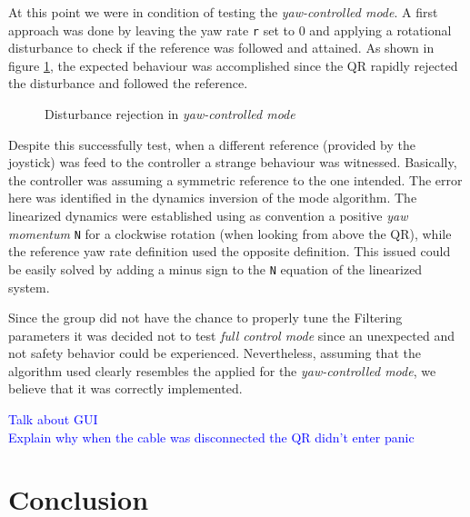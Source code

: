 \documentclass{article}
\newcommand\todo[1]{\textcolor{blue}{#1}} %
\begin{document}
At this point we were in condition of testing the \textit{yaw-controlled mode}. A first approach was done by leaving the yaw rate \texttt{r} set to 0 and applying a rotational disturbance to check if the reference was followed and attained. As shown in figure \ref{fig:YawControl}, the expected behaviour was accomplished since the QR rapidly rejected the disturbance and followed the reference.

\begin{figure}[ht]
\centering
	\caption{Disturbance rejection in \textit{yaw-controlled mode}}
	\label{fig:YawControl}
\end{figure}

Despite this successfully test, when a different reference (provided by the joystick) was feed to the controller a strange behaviour was witnessed. Basically, the controller was assuming a symmetric reference to the one intended. The error here was identified in the dynamics inversion of the mode algorithm. The linearized dynamics were established using as convention a positive \textit{yaw momentum} \texttt{N} for a clockwise rotation (when looking from above the QR), while the reference yaw rate definition used the opposite definition. This issued could be easily solved by adding a minus sign to the \texttt{N} equation of the linearized system.

Since the group did not have the chance to properly tune the Filtering parameters it was decided not to test \textit{full control mode} since an unexpected and not safety behavior could be experienced. Nevertheless, assuming that the algorithm used clearly resembles the applied for the \textit{yaw-controlled mode}, we believe that it was correctly implemented.

\todo{Talk about GUI\\}
\todo{Explain why when the cable was disconnected the QR didn't enter panic} 




\section{Conclusion}
\label{sec:conclusion}
\end{document}
